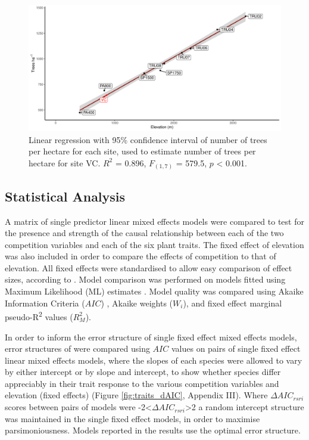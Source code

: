 \documentclass[a4paper, 11pt]{article}
\begin{document}
\begin{figure}[H]
\includegraphics[width=\textwidth]{comp_radius_fit}
\centering
\caption{Linear regression with 95\% confidence interval of number of trees per hectare for each site, used to estimate number of trees per hectare for site VC. $R^2$ = 0.896, $F_{(1,7)}$ = 579.5, $p$ \textless{} 0.001.}
\label{comp_radius_fit}
\end{figure}


\subsection{Statistical Analysis}

A matrix of single predictor linear mixed effects models were compared to test for the presence and strength of the causal relationship between each of the two competition variables and each of the six plant traits. The fixed effect of elevation was also included in order to compare the effects of competition to that of elevation. All fixed effects were standardised to allow easy comparison of effect sizes, according to \citep{Gelman2008, Grueber2011, Gelman2018}. Model comparison was performed on models fitted using Maximum Likelihood (ML) estimates \citep{Bolker2008}. Model quality was compared using Akaike Information Criteria ($AIC$) \citep{Akaike1992}, Akaike weights ($W_i$), and fixed effect marginal pseudo-R\textsuperscript{2} values ($R_M^2$). 

In order to inform the error structure of single fixed effect mixed effects models, error structures of were compared using $AIC$ values on pairs of single fixed effect linear mixed effects models, where the slopes of each species were allowed to vary by either intercept or by slope and intercept, to show whether species differ appreciably in their trait response to the various competition variables and elevation (fixed effects) (Figure \ref{fig:traits_dAIC}, Appendix III). Where $\Delta{}AIC_{rsri}$ scores between pairs of models were -2\textless{}$\Delta{}AIC_{rsri}$\textgreater{}2 a random intercept structure was maintained in the single fixed effect models, in order to maximise parsimoniousness. Models reported in the results use the optimal error structure.
\end{document}
